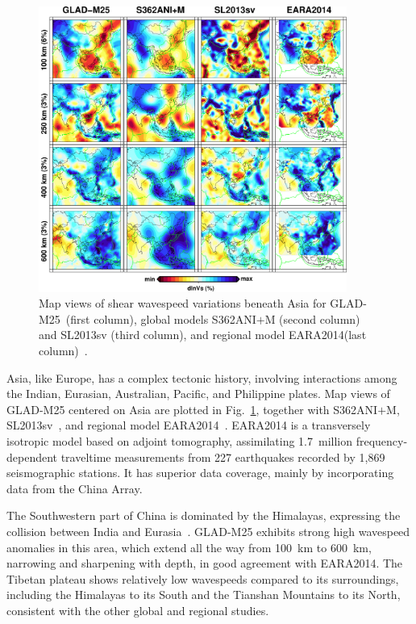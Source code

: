 \begin{figure}[ht!]
  \includegraphics[width=0.9\textwidth]{ch-GLADM25/figures/depth_slice/asia_vs.pdf}
  \caption[Map views of shear wavespeed variations beneath Asia]
  {\small{Map views of shear wavespeed variations beneath Asia for GLAD-M25~(first column),
  global models S362ANI$+$M (second column) and SL2013sv (third column), and regional model EARA2014(last column)~\cite{chen2015multiparameter}.}}
  \label{fig:asia-vs}
  \centering
\end{figure}

Asia, like Europe, has a complex tectonic history, involving
interactions among the Indian, Eurasian, Australian, Pacific, and Philippine
plates.
Map views of GLAD-M25 centered on Asia are plotted in Fig.~\ref{fig:asia-vs},
together with S362ANI$+$M, SL2013sv~\cite{SchaefferLebedev13}, and regional model EARA2014~\cite{chen2015multiparameter}.
EARA2014 is a transversely isotropic model based on adjoint
tomography, assimilating 1.7~million frequency-dependent traveltime
measurements from 227 earthquakes recorded by 1,869 seismographic  stations.
It has superior data coverage, mainly by incorporating data from the China Array.

The Southwestern part of China is dominated by the Himalayas,
expressing the collision between India and Eurasia~\cite{lebedev2003upper}.
GLAD-M25 exhibits strong high wavespeed anomalies in this area,
which extend all the way from 100~km to 600~km, narrowing and sharpening with depth,
in good agreement with EARA2014.
The Tibetan plateau shows relatively low wavespeeds
compared to its surroundings, including the Himalayas to its South and
the Tianshan Mountains to its North, consistent with the other global
and regional studies.

